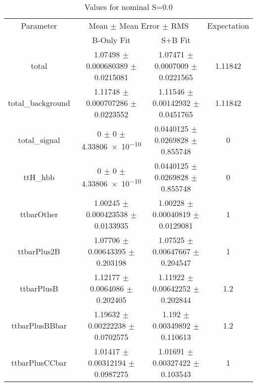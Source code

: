 \begin{table}
\centering
\caption{Values for nominal S=0.0}
\begin{tabular}{cccc}
\toprule
Parameter & \multicolumn{2}{c}{Mean $\pm$ Mean Error $\pm$ RMS} & Expectation\\
 & B-Only Fit & S+B Fit & \\
\midrule
total & \num{1.07498} $\pm$ \num{0.000680389} $\pm$ \num{0.0215081} & \num{1.07471} $\pm$ \num{0.0007009} $\pm$ \num{0.0221565} & \num{1.11842}\\
total\_background & \num{1.11748} $\pm$ \num{0.000707286} $\pm$ \num{0.0223552} & \num{1.11546} $\pm$ \num{0.00142932} $\pm$ \num{0.0451765} & \num{1.11842}\\
total\_signal & \num{0} $\pm$ \num{0} $\pm$ \num{4.33806e-10} & \num{0.0440125} $\pm$ \num{0.0269828} $\pm$ \num{0.855748} & \num{0}\\
ttH\_hbb & \num{0} $\pm$ \num{0} $\pm$ \num{4.33806e-10} & \num{0.0440125} $\pm$ \num{0.0269828} $\pm$ \num{0.855748} & \num{0}\\
ttbarOther & \num{1.00245} $\pm$ \num{0.000423538} $\pm$ \num{0.0133935} & \num{1.00228} $\pm$ \num{0.00040819} $\pm$ \num{0.0129081} & \num{1}\\
ttbarPlus2B & \num{1.07706} $\pm$ \num{0.00643395} $\pm$ \num{0.203198} & \num{1.07525} $\pm$ \num{0.00647667} $\pm$ \num{0.204547} & \num{1}\\
ttbarPlusB & \num{1.12177} $\pm$ \num{0.0064086} $\pm$ \num{0.202405} & \num{1.11922} $\pm$ \num{0.00642252} $\pm$ \num{0.202844} & \num{1.2}\\
ttbarPlusBBbar & \num{1.19632} $\pm$ \num{0.00222238} $\pm$ \num{0.0702575} & \num{1.192} $\pm$ \num{0.00349892} $\pm$ \num{0.110613} & \num{1.2}\\
ttbarPlusCCbar & \num{1.01417} $\pm$ \num{0.00312194} $\pm$ \num{0.0987275} & \num{1.01691} $\pm$ \num{0.00327422} $\pm$ \num{0.103543} & \num{1}\\
\bottomrule
\end{tabular}
\end{table}